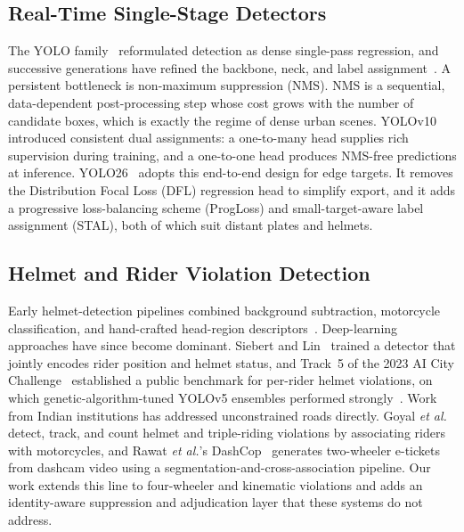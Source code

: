 \documentclass[conference]{IEEEtran}
\begin{document}
\subsection{Real-Time Single-Stage Detectors}
The YOLO family~\cite{redmon2016yolo} reformulated detection as dense single-pass regression, and successive generations have refined the backbone, neck, and label assignment~\cite{wang2023yolov7,jocher2023yolov8,jocher2024yolo11}. A persistent bottleneck is non-maximum suppression (NMS). NMS is a sequential, data-dependent post-processing step whose cost grows with the number of candidate boxes, which is exactly the regime of dense urban scenes. YOLOv10~\cite{wang2024yolov10} introduced consistent dual assignments: a one-to-many head supplies rich supervision during training, and a one-to-one head produces NMS-free predictions at inference. YOLO26~\cite{ultralytics2025yolo26} adopts this end-to-end design for edge targets. It removes the Distribution Focal Loss (DFL) regression head to simplify export, and it adds a progressive loss-balancing scheme (ProgLoss) and small-target-aware label assignment (STAL), both of which suit distant plates and helmets.

\subsection{Helmet and Rider Violation Detection}
Early helmet-detection pipelines combined background subtraction, motorcycle classification, and hand-crafted head-region descriptors~\cite{dahiya2016}. Deep-learning approaches have since become dominant. Siebert and Lin~\cite{siebert2020} trained a detector that jointly encodes rider position and helmet status, and Track~5 of the 2023 AI City Challenge~\cite{naphade2023aicity} established a public benchmark for per-rider helmet violations, on which genetic-algorithm-tuned YOLOv5 ensembles performed strongly~\cite{soltanikazemi2023}. Work from Indian institutions has addressed unconstrained roads directly. Goyal \emph{et al.}~\cite{goyal2022} detect, track, and count helmet and triple-riding violations by associating riders with motorcycles, and Rawat \emph{et al.}'s DashCop~\cite{rawat2025dashcop} generates two-wheeler e-tickets from dashcam video using a segmentation-and-cross-association pipeline. Our work extends this line to four-wheeler and kinematic violations and adds an identity-aware suppression and adjudication layer that these systems do not address.
\end{document}
